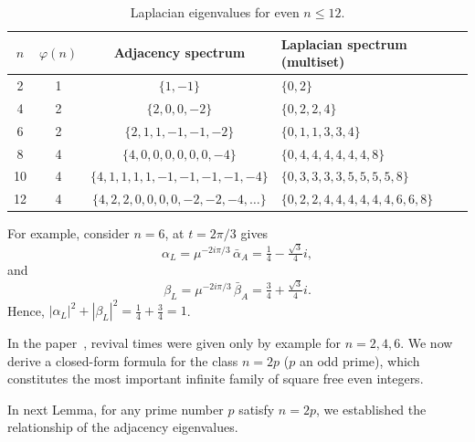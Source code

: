 \documentclass[12pt]{amsart}
\begin{document}
\begin{table}[H]
\centering
\begin{tabular}{@{}|c|c|c|l|@{}}
\hline
$n$ & $\varphi(n)$ & Adjacency spectrum & Laplacian spectrum (multiset) \\
\hline
2  & 1 & $\{1,-1\}$            & $\{0,2\}$               \\ \hline
4  & 2 & $\{2,0,0,-2\}$        & $\{0,2,2,4\}$           \\ \hline
6  & 2 & $\{2,1,1,-1,-1,-2\}$  & $\{0,1,1,3,3,4\}$       \\ \hline
8  & 4 & $\{4,0,0,0,0,0,0,-4\}$& $\{0,4,4,4,4,4,4,8\}$  \\ \hline
10 & 4 & $\{4,1,1,1,1,-1,-1,-1,-1,-4\}$ & $\{0,3,3,3,3,5,5,5,5,8\}$ \\ \hline
12 & 4 & $\{4,2,2,0,0,0,0,-2,-2,-4,\ldots\}$ & $\{0,2,2,4,4,4,4,4,4,6,6,8\}$ \\ 
\hline
\end{tabular}
\caption{Laplacian eigenvalues  for even $n \leq 12$.}
\label{tab01laplacian}
\end{table}


For example,   consider $n = 6$, at $t = 2\pi/3$ gives
  \[
    \alpha_L=\mu^{-2i\pi/3}\,\bar{\alpha}_A = \tfrac{1}{4} - \tfrac{\sqrt{3}}{4}i,
  \]
  and 
  \[
   \beta_L=\mu^{-2i\pi/3}\,\bar{\beta}_A  = \tfrac{3}{4} + \tfrac{\sqrt{3}}{4}i.
  \]
Hence, $|\alpha_L|^2+|\beta_L|^2=\tfrac{1}{4}+\tfrac{3}{4}=1$. 


In the paper~\cite{soni2025original}, revival times were given only by example for
$n = 2, 4, 6$. We now derive a closed-form formula for the class $n = 2p$ ($p$ an odd prime),
which constitutes the most important infinite family of square free even integers.


In next Lemma, for any prime number $p$ satisfy $n=2p$, we established the relationship of the adjacency eigenvalues.
\end{document}
